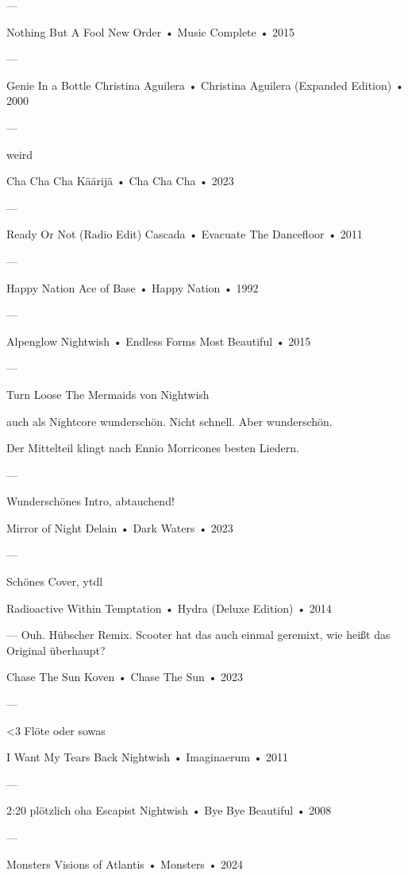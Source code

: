 —

Nothing But A Fool
New Order
 •
Music Complete
 •
2015



—

Genie In a Bottle
Christina Aguilera
 •
Christina Aguilera (Expanded Edition)
 •
2000



—


weird

Cha Cha Cha
Käärijä
 •
Cha Cha Cha
 •
2023


—

Ready Or Not (Radio Edit)
Cascada
 •
Evacuate The Dancefloor
 •
2011



—

Happy Nation
Ace of Base
 •
Happy Nation
 •
1992




—

Alpenglow
Nightwish
 •
Endless Forms Most Beautiful
 •
2015


—

Turn Loose The Mermaids
von Nightwish

auch als Nightcore wunderschön. Nicht schnell. Aber wunderschön.

Der Mittelteil klingt nach Ennio Morricones besten Liedern.

—

Wunderschönes Intro, abtauchend!

Mirror of Night
Delain
 •
Dark Waters
 •
2023



—

Schönes Cover, ytdl

Radioactive
Within Temptation
 •
Hydra (Deluxe Edition)
 •
2014



—
Ouh. Hübscher Remix. Scooter hat das auch einmal geremixt, wie heißt das Original überhaupt?

Chase The Sun
Koven
 •
Chase The Sun
 •
2023


—

<3 Flöte oder sowas

I Want My Tears Back
Nightwish
 •
Imaginaerum
 •
2011


—

2:20 plötzlich oha
Escapist
Nightwish
 •
Bye Bye Beautiful
 •
2008


—

Monsters
Visions of Atlantis
 •
Monsters
 •
2024



